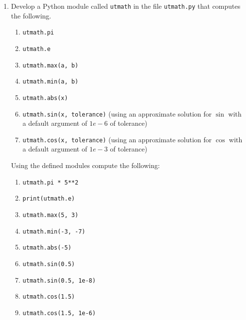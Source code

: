 \documentclass[a4paper,12pt]{article}
\begin{document}
\begin{enumerate}
	\item Develop a Python module called \verb|utmath| in the file  \verb|utmath.py| that computes the following.
	\begin{enumerate}
		\item \verb|utmath.pi|
		\item \verb|utmath.e|
		\item \verb|utmath.max(a, b)|
		\item \verb|utmath.min(a, b)|
		\item \verb|utmath.abs(x)|
		\item \verb|utmath.sin(x, tolerance)| (using an approximate solution for $\sin$ with a default argument of $1e-6$ of tolerance)
		\item \verb|utmath.cos(x, tolerance)| (using an approximate solution for $\cos$ with a default argument of $1e-3$ of tolerance)
	\end{enumerate}

	Using the defined modules compute the following:
	
	\begin{enumerate}
		\item \verb|utmath.pi * 5**2|
		\item \verb|print(utmath.e)|
		\item \verb|utmath.max(5, 3)|
		\item \verb|utmath.min(-3, -7)|
		\item \verb|utmath.abs(-5)|
		\item \verb|utmath.sin(0.5)|
		\item \verb|utmath.sin(0.5, 1e-8)|
		\item \verb|utmath.cos(1.5)|
		\item \verb|utmath.cos(1.5, 1e-6)|
	\end{enumerate}

\end{enumerate}
\end{document}
